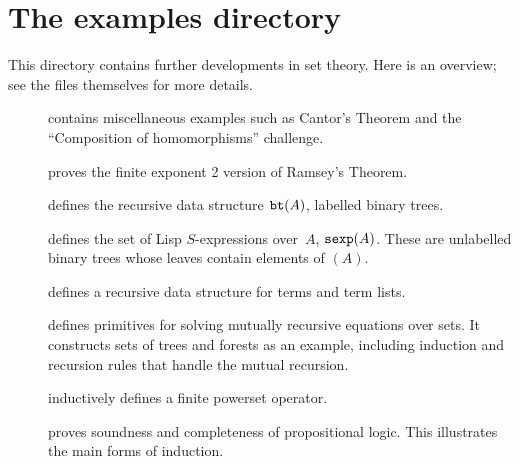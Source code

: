 \section{The examples directory}
This directory contains further developments in {\ZF} set theory.  Here is
an overview; see the files themselves for more details.
\begin{description}
\item[]
contains miscellaneous examples such as Cantor's Theorem and the
``Composition of homomorphisms'' challenge.

\item[]
proves the finite exponent 2 version of Ramsey's Theorem.

\item[]
defines the recursive data structure ${\tt bt}(A)$, labelled binary trees.

\item[]
defines the set of Lisp $S$-expressions over~$A$, ${\tt sexp}(A)$.  These
are unlabelled binary trees whose leaves contain elements of $(A)$.

\item[]
defines a recursive data structure for terms and term lists.

\item[]
defines primitives for solving mutually recursive equations over sets.
It constructs sets of trees and forests as an example, including induction
and recursion rules that handle the mutual recursion.

\item[]
inductively defines a finite powerset operator.

\item[]
proves soundness and completeness of propositional logic.  This illustrates
the main forms of induction.
\end{description}


